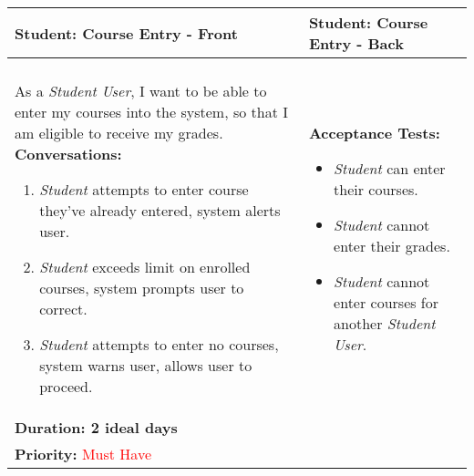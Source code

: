 \documentclass[11pt]{article}
\begin{document}
\begin{center}
\begin{tabular}{ | m{8cm}  |  m{8cm}  | } 
 \hline
 \textbf{Student: Course Entry - Front} &  \textbf{Student: Course Entry - Back}  \\ 
  \hline
&\\[5pt]
As a \emph{Student User}, I want to be able to enter my courses into the system, so that I am eligible to receive my grades.
\newline
\textbf{Conversations:}
\begin{enumerate}
\item{\emph{Student} attempts to enter course they've already entered, system alerts user.}
\item{\emph{Student} exceeds limit on enrolled courses, system prompts user to correct.} 
\item{\emph{Student} attempts to enter no courses, system warns user, allows user to proceed.}
\end{enumerate} 
& \textbf{Acceptance Tests:} 
\begin{itemize}
\item{\emph{Student} can enter their courses.}
\item{\emph{Student} cannot enter their grades.}
\item{\emph{Student} cannot enter courses for another \emph{Student User}.}
\end{itemize} \\
\textbf{Duration: 2 ideal days} &\\
\textbf{Priority:}  \textcolor{red}{Must Have} & \\
 \hline
\end{tabular}
\end{center}
\end{document}
